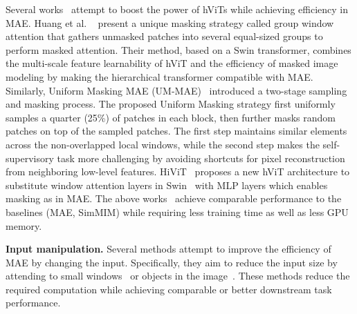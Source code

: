 \documentclass[10pt,journal,compsoc]{IEEEtran}
\begin{document}
Several works~\cite{huang2022green, li2022uniform, zhang2022hivit} attempt to boost the power of hViTs while achieving efficiency in MAE. Huang et al. ~\cite{huang2022green} present a unique masking strategy called group window attention that gathers unmasked patches into several equal-sized groups to perform masked attention. Their method, based on a Swin transformer, combines the multi-scale feature learnability of hViT and the efficiency of masked image modeling by making the hierarchical transformer compatible with MAE. 
Similarly, Uniform Masking MAE (UM-MAE)~\cite{li2022uniform} introduced a two-stage sampling and masking process. The proposed Uniform Masking strategy first uniformly samples a quarter (25\%) of patches in each block, then further masks random patches on top of the sampled patches. The first step maintains similar elements across the non-overlapped local windows, while the second step makes the self-supervisory task more challenging by avoiding shortcuts for pixel reconstruction from neighboring low-level features. HiViT~\cite{zhang2022hivit} proposes a new hViT architecture to substitute window attention layers in Swin~\cite{liu2021swin} with MLP layers which enables masking as in MAE. The above works~\cite{huang2022green, li2022uniform, zhang2022hivit} achieve comparable performance to the baselines (MAE, SimMIM) while requiring less training time as well as less GPU memory.



\textbf{Input manipulation.}
Several methods attempt to improve the efficiency of MAE by changing the input. Specifically, they aim to reduce the input size by attending to small windows~\cite{chen2022efficient} or objects in the image~\cite{wu2022object}. These methods reduce the required computation while achieving comparable or better downstream task performance. 
\end{document}
